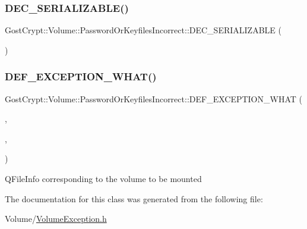 \subsubsection{\texorpdfstring{D\+E\+C\+\_\+\+S\+E\+R\+I\+A\+L\+I\+Z\+A\+B\+L\+E()}{DEC\_SERIALIZABLE()}}
{\footnotesize\ttfamily Gost\+Crypt\+::\+Volume\+::\+Password\+Or\+Keyfiles\+Incorrect\+::\+D\+E\+C\+\_\+\+S\+E\+R\+I\+A\+L\+I\+Z\+A\+B\+LE (\begin{DoxyParamCaption}\item[{\hyperlink{class_gost_crypt_1_1_volume_1_1_password_or_keyfiles_incorrect}{Password\+Or\+Keyfiles\+Incorrect}}]{ }\end{DoxyParamCaption})}

\mbox{\label{class_gost_crypt_1_1_volume_1_1_password_or_keyfiles_incorrect_a6115c764ed87f31dba808c2b8017d0b5}} 
\subsubsection{\texorpdfstring{D\+E\+F\+\_\+\+E\+X\+C\+E\+P\+T\+I\+O\+N\+\_\+\+W\+H\+A\+T()}{DEF\_EXCEPTION\_WHAT()}}
{\footnotesize\ttfamily Gost\+Crypt\+::\+Volume\+::\+Password\+Or\+Keyfiles\+Incorrect\+::\+D\+E\+F\+\_\+\+E\+X\+C\+E\+P\+T\+I\+O\+N\+\_\+\+W\+H\+AT (\begin{DoxyParamCaption}\item[{\hyperlink{class_gost_crypt_1_1_volume_1_1_password_or_keyfiles_incorrect}{Password\+Or\+Keyfiles\+Incorrect}}]{,  }\item[{\hyperlink{class_gost_crypt_1_1_volume_1_1_volume_exception}{Volume\+Exception}}]{,  }\item[{\char`\"{}The given password or keyfiles for the volume \char`\"{}+volume\+Path.\+canonical\+File\+Path()+\char`\"{}are incorrect.\char`\"{}}]{ }\end{DoxyParamCaption})}

Q\+File\+Info corresponding to the volume to be mounted 

The documentation for this class was generated from the following file\+:\begin{DoxyCompactItemize}
\item 
Volume/\hyperlink{_volume_exception_8h}{Volume\+Exception.\+h}\end{DoxyCompactItemize}
